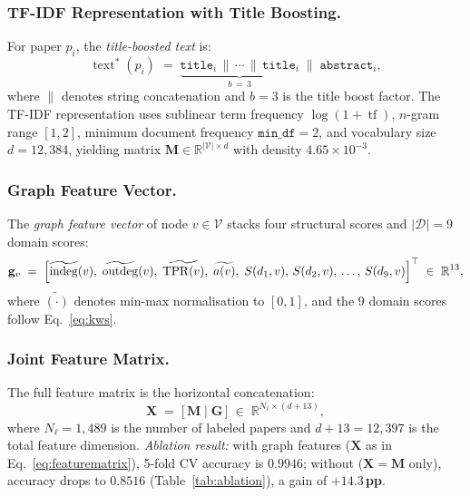 \documentclass[letterpaper]{article}
\theoremstyle{plain}
\theoremstyle{definition}
\theoremstyle{remark}
\newcommand{\V}{\mathcal{V}}
\newcommand{\D}{\mathcal{D}}
\newcommand{\X}{\mathbf{X}}
\newcommand{\M}{\mathbf{M}}
\newcommand{\Gmat}{\mathbf{G}}
\newcommand{\R}{\mathbb{R}}
\newcommand{\tpr}[1]{\operatorname{TPR}(#1)}
\newcommand{\auth}[1]{a(#1)}
\begin{document}
\subsubsection{TF-IDF Representation with Title Boosting.}
For paper $p_i$, the \emph{title-boosted text} is:
\begin{equation}
    \operatorname{text}^*(p_i)
    \;=\;
    \underbrace{\mathtt{title}_i
                \,\|\, \cdots \,\|\,
                \mathtt{title}_i}_{b\,=\,3}
    \;\|\;
    \mathtt{abstract}_i,
    \label{eq:titleboost}
\end{equation}
where $\|$ denotes string concatenation and $b = 3$
is the title boost factor.
The TF-IDF representation uses sublinear term frequency
$\log(1+\operatorname{tf})$, $n$-gram range $[1,2]$,
minimum document frequency $\mathtt{min\_df} = 2$,
and vocabulary size $d = 12{,}384$,
yielding matrix $\M \in \R^{|\V| \times d}$
with density $4.65 \times 10^{-3}$.

\subsubsection{Graph Feature Vector.}
The \emph{graph feature vector} of node $v \in \V$
stacks four structural scores and $|\D|=9$ domain scores:
\begin{equation}
    \mathbf{g}_v
    \;=\;
    \Bigl[
        \widetilde{\operatorname{indeg}}(v),\;
        \widetilde{\operatorname{outdeg}}(v),\;
        \widetilde{\tpr{v}},\;
        \widetilde{\auth{v}},\;
        S(d_1,v),\,
        S(d_2,v),\,
        \ldots,\,
        S(d_9,v)
    \Bigr]^\top
    \;\in\; \R^{13},
    \label{eq:graphvec}
\end{equation}
where $\widetilde{(\cdot)}$ denotes min-max normalisation
to $[0,1]$, and the 9 domain scores follow
Eq.~\eqref{eq:kws}.

\subsubsection{Joint Feature Matrix.}
The full feature matrix is the horizontal concatenation:
\begin{equation}
    \X
    \;=\;
    \bigl[\,\M \;\big|\; \Gmat\,\bigr]
    \;\in\;
    \R^{N_\ell \times (d + 13)},
    \label{eq:featurematrix}
\end{equation}
where $N_\ell = 1{,}489$ is the number of labeled papers
and $d + 13 = 12{,}397$ is the total feature dimension.
\emph{Ablation result:}
with graph features ($\X$ as in Eq.~\eqref{eq:featurematrix}),
5-fold CV accuracy is $0.9946$;
without ($\X = \M$ only),
accuracy drops to $0.8516$
(Table~\ref{tab:ablation}), a gain of
$\mathbf{+14.3}$\,\textbf{pp}.
\end{document}
